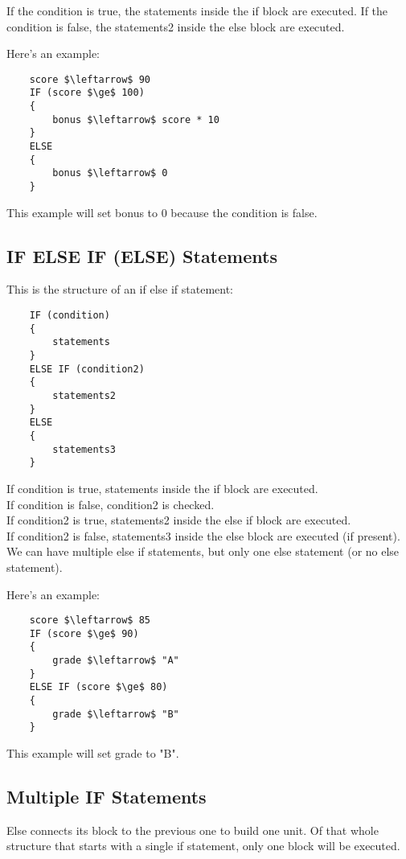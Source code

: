 \documentclass{article}
\begin{document}
If the condition is true, the statements inside the if block are executed.
If the condition is false, the statements2 inside the else block are executed.

Here's an example:
\begin{lstlisting}
    score $\leftarrow$ 90
    IF (score $\ge$ 100)
    {
        bonus $\leftarrow$ score * 10
    }
    ELSE
    {
        bonus $\leftarrow$ 0
    }
\end{lstlisting}

This example will set bonus to 0 because the condition is false.

\subsection*{IF ELSE IF (ELSE) Statements}

This is the structure of an if else if statement:
\begin{lstlisting}
    IF (condition)
    {
        statements
    }
    ELSE IF (condition2)
    {
        statements2
    }
    ELSE
    {
        statements3
    }
\end{lstlisting}
If condition is true, statements inside the if block are executed.\\
If condition is false, condition2 is checked.\\
If condition2 is true, statements2 inside the else if block are executed.\\
If condition2 is false, statements3 inside the else block are executed (if present).\\
We can have multiple else if statements, but only one else statement (or no else statement).

Here's an example:
\begin{lstlisting}
    score $\leftarrow$ 85
    IF (score $\ge$ 90)
    {
        grade $\leftarrow$ "A"
    }
    ELSE IF (score $\ge$ 80)
    {
        grade $\leftarrow$ "B"
    }
\end{lstlisting}

This example will set grade to "B".


\subsection{Multiple IF Statements}

Else connects its block to the previous one to build one unit. Of that whole structure that starts with a single if statement, only one block will be executed.
\end{document}
